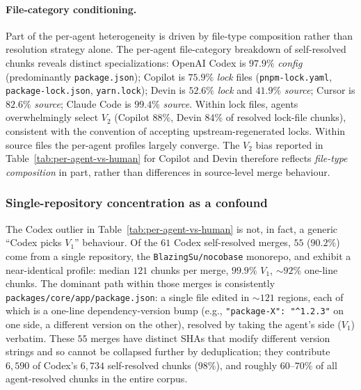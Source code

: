 \documentclass[sigconf,anonymous]{acmart}
\begin{document}
\paragraph{File-category conditioning.} Part of the per-agent heterogeneity is driven by file-type composition rather than resolution strategy alone. The per-agent file-category breakdown of self-resolved chunks reveals distinct specializations: OpenAI Codex is $97.9\%$ \emph{config} (predominantly \texttt{package.json}); Copilot is $75.9\%$ \emph{lock} files (\texttt{pnpm-lock.yaml}, \texttt{package-lock.json}, \texttt{yarn.lock}); Devin is $52.6\%$ \emph{lock} and $41.9\%$ \emph{source}; Cursor is $82.6\%$ \emph{source}; Claude Code is $99.4\%$ \emph{source}. Within lock files, agents overwhelmingly select $V_2$ (Copilot $88\%$, Devin $84\%$ of resolved lock-file chunks), consistent with the convention of accepting upstream-regenerated locks. Within source files the per-agent profiles largely converge. The $V_2$ bias reported in Table~\ref{tab:per-agent-vs-human} for Copilot and Devin therefore reflects \emph{file-type composition} in part, rather than differences in source-level merge behaviour.

\subsubsection{Single-repository concentration as a confound}
\label{sec:rq2-codex}

The Codex outlier in Table~\ref{tab:per-agent-vs-human} is not, in fact, a generic ``Codex picks $V_1$'' behaviour. Of the $61$ Codex self-resolved merges, $55$ ($90.2\%$) come from a single repository, the \texttt{BlazingSu/nocobase} monorepo, and exhibit a near-identical profile: median $121$ chunks per merge, $99.9\%$ $V_1$, $\sim$$92\%$ one-line chunks. The dominant path within those merges is consistently \texttt{packages/core/app/package.json}: a single file edited in $\sim 121$ regions, each of which is a one-line dependency-version bump (e.g., \texttt{"package-X": "\textasciicircum{}1.2.3"} on one side, a different version on the other), resolved by taking the agent's side ($V_1$) verbatim. These $55$ merges have distinct SHAs that modify different version strings and so cannot be collapsed further by deduplication; they contribute $6{,}590$ of Codex's $6{,}734$ self-resolved chunks ($98\%$), and roughly $60$--$70\%$ of all agent-resolved chunks in the entire corpus.
\end{document}
